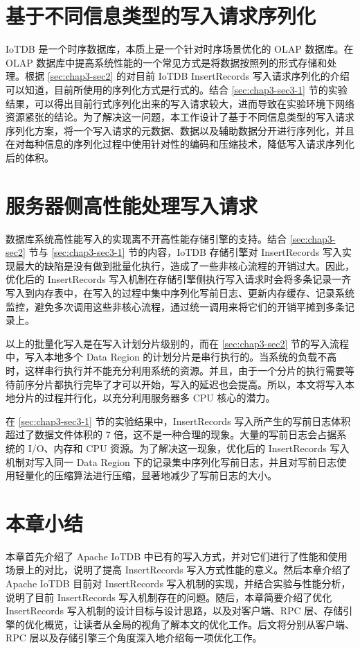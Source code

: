 \section{基于不同信息类型的写入请求序列化}
IoTDB 是一个时序数据库，本质上是一个针对时序场景优化的 OLAP 数据库\cite{谭新宇2023一致性协议}。在 OLAP 数据库中提高系统性能的一个常见方式是将数据按照列的形式存储和处理。根据 \ref{sec:chap3-sec2} 的对目前 IoTDB InsertRecords 写入请求序列化的介绍可以知道，目前所使用的序列化方式是行式的。结合 \ref{sec:chap3-sec3-1} 节的实验结果，可以得出目前行式序列化出来的写入请求较大，进而导致在实验环境下网络资源紧张的结论。为了解决这一问题，本工作设计了基于不同信息类型的写入请求序列化方案，将一个写入请求的元数据、数据以及辅助数据分开进行序列化，并且在对每种信息的序列化过程中使用针对性的编码和压缩技术，降低写入请求序列化后的体积。

\section{服务器侧高性能处理写入请求}
数据库系统高性能写入的实现离不开高性能存储引擎的支持。结合 \ref{sec:chap3-sec2} 节与 \ref{sec:chap3-sec3-1} 节的内容，IoTDB 存储引擎对 InsertRecords 写入实现最大的缺陷是没有做到批量化执行，造成了一些非核心流程的开销过大。因此，优化后的 InsertRecords 写入机制在存储引擎侧执行写入请求时会将多条记录一齐写入到内存表中，在写入的过程中集中序列化写前日志、更新内存缓存、记录系统监控，避免多次调用这些非核心流程，通过统一调用来将它们的开销平摊到多条记录上。

以上的批量化写入是在写入计划分片级别的，而在 \ref{sec:chap3-sec2} 节的写入流程中，写入本地多个 Data Region 的计划分片是串行执行的。当系统的负载不高时，这样串行执行并不能充分利用系统的资源。并且，由于一个分片的执行需要等待前序分片都执行完毕了才可以开始，写入的延迟也会提高。所以，本文将写入本地分片的过程并行化，以充分利用服务器多 CPU 核心的潜力。

在 \ref{sec:chap3-sec3-1} 节的实验结果中，InsertRecords 写入所产生的写前日志体积超过了数据文件体积的 7 倍，这不是一种合理的现象。大量的写前日志会占据系统的 I/O、内存和 CPU 资源。为了解决这一现象，优化后的 InsertRecords 写入机制对写入同一 Data Region 下的记录集中序列化写前日志，并且对写前日志使用轻量化的压缩算法进行压缩，显著地减少了写前日志的大小。


\section{本章小结}
本章首先介绍了 Apache IoTDB 中已有的写入方式，并对它们进行了性能和使用场景上的对比，说明了提高 InsertRecords 写入方式性能的意义。然后本章介绍了 Apache IoTDB 目前对 InsertRecords 写入机制的实现，并结合实验与性能分析，说明了目前 InsertRecords 写入机制存在的问题。随后，本章简要介绍了优化 InsertRecords 写入机制的设计目标与设计思路，以及对客户端、RPC 层、存储引擎的优化概览，让读者从全局的视角了解本文的优化工作。后文将分别从客户端、RPC 层以及存储引擎三个角度深入地介绍每一项优化工作。

